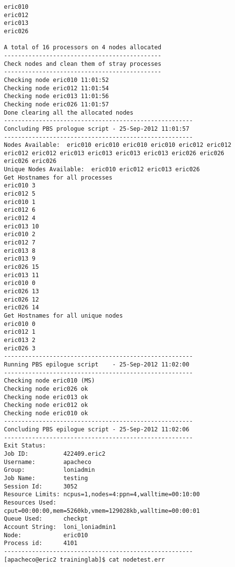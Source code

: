 \documentclass[slidestop,mathserif,compress,xcolor=svgnames]{beamer}
\begin{document}
\begin{frame}
{\begin{verbatim}
eric010
eric012
eric013
eric026

A total of 16 processors on 4 nodes allocated
---------------------------------------------
Check nodes and clean them of stray processes
---------------------------------------------
Checking node eric010 11:01:52 
Checking node eric012 11:01:54 
Checking node eric013 11:01:56 
Checking node eric026 11:01:57 
Done clearing all the allocated nodes
------------------------------------------------------
Concluding PBS prologue script - 25-Sep-2012 11:01:57
------------------------------------------------------
Nodes Available:  eric010 eric010 eric010 eric010 eric012 eric012 eric012 eric012 eric013 eric013 eric013 eric013 eric026 eric026 
eric026 eric026
Unique Nodes Available:  eric010 eric012 eric013 eric026
Get Hostnames for all processes
eric010 3
eric012 5
eric010 1
eric012 6
eric012 4
eric013 10
eric010 2
eric012 7
eric013 8
eric013 9
eric026 15
eric013 11
eric010 0
eric026 13
eric026 12
eric026 14
Get Hostnames for all unique nodes
eric010 0
eric012 1
eric013 2
eric026 3
------------------------------------------------------
Running PBS epilogue script    - 25-Sep-2012 11:02:00
------------------------------------------------------
Checking node eric010 (MS)
Checking node eric026 ok
Checking node eric013 ok
Checking node eric012 ok
Checking node eric010 ok
------------------------------------------------------
Concluding PBS epilogue script - 25-Sep-2012 11:02:06
------------------------------------------------------
Exit Status:    
Job ID:          422409.eric2
Username:        apacheco
Group:           loniadmin
Job Name:        testing
Session Id:      3052
Resource Limits: ncpus=1,nodes=4:ppn=4,walltime=00:10:00
Resources Used:  cput=00:00:00,mem=5260kb,vmem=129028kb,walltime=00:00:01
Queue Used:      checkpt
Account String:  loni_loniadmin1
Node:            eric010
Process id:      4101
------------------------------------------------------
[apacheco@eric2 traininglab]$ cat nodetest.err
    \end{verbatim}
  }
\end{frame}
\end{document}
